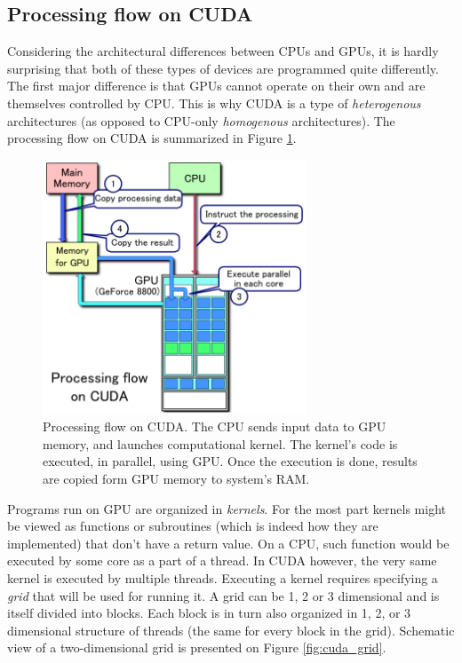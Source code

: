 \subsection{Processing flow on CUDA}
Considering the architectural differences between CPUs and GPUs, it is hardly surprising that both of these types of devices are programmed quite differently. The first major difference is that GPUs cannot operate on their own and are themselves controlled by CPU. This is why CUDA is a type of \emph{heterogenous} architectures (as opposed to CPU-only \emph{homogenous} architectures). The processing flow on CUDA is summarized in Figure \ref{fig:cuda_flow}.

\begin{figure}[ht]
    \centering
    \includegraphics[width=0.7\textwidth]{figures/CUDA_processing_flow_(En).png}
    \caption{{\protect{}} Processing flow on CUDA. The CPU sends input data to GPU memory, and launches computational kernel. The kernel's code is executed, in parallel, using GPU. Once the execution is done, results are copied form GPU memory to system's RAM.}
    \label{fig:cuda_flow}
\end{figure}

Programs run on GPU are organized in \emph{kernels}. For the most part kernels might be viewed as functions or subroutines (which is indeed how they are implemented) that don't have a return value. On a CPU, such function would be executed by some core as a part of a thread. In CUDA however, the very same kernel is executed by multiple threads. Executing a kernel requires specifying a \emph{grid} that will be used for running it. A grid can be 1, 2 or 3 dimensional and is itself divided into blocks. Each block is in turn also organized in 1, 2, or 3 dimensional structure of threads (the same for every block in the grid). Schematic view of a two-dimensional grid is presented on Figure \ref{fig:cuda_grid}.

